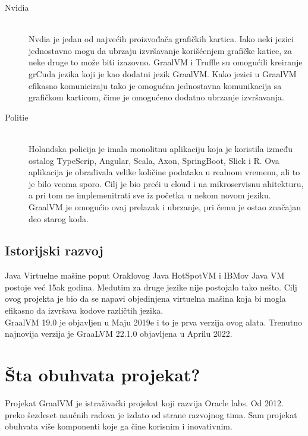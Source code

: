 \documentclass[a4paper]{article}
\begin{document}
\begin{description}
	\item[Nvidia]  \hfil \\
	Nvdia je jedan od najvećih proizvođača grafičkih kartica. Iako neki jezici jednostavno mogu da ubrzaju izvršavanje korišćenjem grafičke katice, za neke druge to može biti izazovno. GraalVM i Truffle su omogućili kreiranje grCuda jezika koji je kao dodatni jezik GraalVM. Kako jezici u GraalVM efikasno komuniciraju tako je omogućna jednostavna komunikacija sa grafičkom karticom, čime je omogućeno dodatno ubrzanje izvršavanja.
	
	\item[Politie]  \hfil \\
	Holandska policija je imala monolitnu aplikaciju koja je koristila između ostalog TypeScrip, Angular, Scala, Axon, SpringBoot, Slick i R. Ova aplikacija je obrađivala velike količine podataka u realnom vremenu, ali to je bilo veoma sporo. Cilj je bio preći u cloud i na mikroservisnu ahitekturu, a pri tom ne implemenitrati sve iz početka u nekom novom jeziku. GraalVM je omogućio ovaj prelazak i ubrzanje, pri čemu je ostao značajan deo starog koda.
	
\end{description}


\subsection{Istorijski razvoj}
\label{subsec:Istorijski razvoj}

Java Virtuelne mašine poput Oraklovog Java HotSpotVM i IBMov Java VM postoje već 15ak godina. Međutim za druge jezike nije postojalo tako nešto. Cilj ovog projekta je bio da se napavi objedinjena virtuelna mašina koja bi mogla efikasno da izvršava kodove različtih jezika.\\

GraalVM 19.0 je objavljen u Maju 2019e i to je prva verzija ovog alata. Trenutno najnovija verzija je GraaLVM 22.1.0 objavljena u Aprilu 2022. 

\section{Šta obuhvata projekat?}
\label{sec:Šta obuhvata projekat?}

Projekat GraalVM je istraživački projekat koji razvija Oracle labs. Od 2012. preko šezdeset naučnih radova je izdato od strane razvojnog tima. Sam projekat obuhvata više komponenti koje ga čine korisnim i inovativnim.
\end{document}
